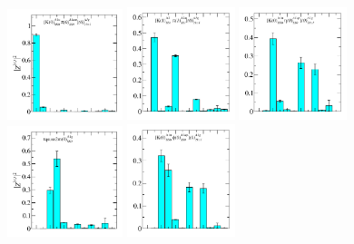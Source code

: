 \begin{figure}
  \includegraphics[width=0.3\textwidth]{figures/spectrum_a1g/with_tq/zfactors/zfactor_isodoublet_kaon_pion-A1g_1-P000-A1u-SS_0-P000-A1um-SS_0.pdf}
  \includegraphics[width=0.28\textwidth]{figures/spectrum_a1g/with_tq/zfactors/zfactor_isodoublet_kaon_pion-A1g_1-P001-A2-SS_1-P00-1-A2m-SS_1.pdf}
  \includegraphics[width=0.28\textwidth]{figures/spectrum_a1g/with_tq/zfactors/zfactor_isodoublet_kaon_eta-A1g_1-P000-A1u-SS_0-P000-A1up-SS_0.pdf}\\
  \includegraphics[width=0.3\textwidth]{figures/spectrum_a1g/with_tq/zfactors/zfactor_tqsuss2m-P000-A1g_1-SS_2.pdf}
  \includegraphics[width=0.28\textwidth]{figures/spectrum_a1g/with_tq/zfactors/zfactor_isodoublet_kaon_phi-A1g_1-P000-A1u-SS_0-P000-A1up-SS_0.pdf}

\end{figure}
